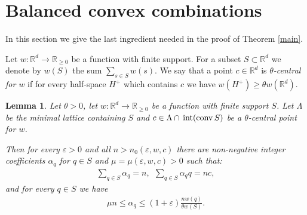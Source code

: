 \documentclass{daj}
\renewcommand{\le}{\leqslant}
\renewcommand{\ge}{\geqslant}
\newcommand{\R}{\mathbb R}
\newcommand{\conv}{{\rm conv}\,}
\newtheorem{lemma}[theorem]{Lemma}
\theoremstyle{definition}
\theoremstyle{remark}
\theoremstyle{definition}
\theoremstyle{definition}
\begin{document}
\section{Balanced convex combinations}\label{balcon}

In this section we give the last ingredient needed in the proof of Theorem \ref{main}.

Let $w: \R^d \rightarrow \R_{\ge 0}$ be a function with finite support. For a subset $S \subset \R^d$ we denote by $w(S)$ the sum $\sum_{s \in S} w(s)$.
We say that a point $c \in \R^d$ is {\em $\theta$-central for $w$} if for every half-space $H^+$ which contains $c$ we have $w(H^+) \ge \theta w(\R^d)$.




\begin{lemma}\label{lm2}
Let $\theta > 0$, let $w: \R^d \rightarrow \R_{\ge 0}$ be a function with finite support $S$. 
Let $\Lambda$ be the minimal lattice containing $S$ and $c \in \Lambda \cap \,{\rm int}(\conv{S})$ be a $\theta$-central point for $w$.

Then for every $\varepsilon > 0$ and all $n > n_0(\varepsilon, w, c)$ there are non-negative integer coefficients $\alpha_q$ for $q \in S$ and $\mu = \mu(\varepsilon, w, c) > 0$ such that:
\begin{align}\label{eqlm}
    \sum_{q \in S} \alpha_q = n,~~    \sum_{q \in S} \alpha_q q = n c, 
\end{align}
and for every $q\in S$ we have 
\begin{align}\label{eqlm2}
    \mu n \le \alpha_q \le  (1 + \varepsilon) \frac{n w(q)}{\theta w(S)}.
\end{align}
\end{lemma}
\end{document}
